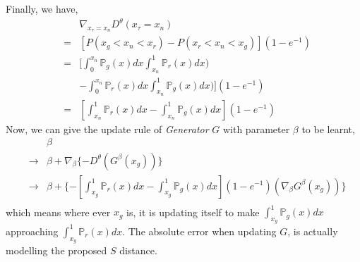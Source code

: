 \documentclass[letterpaper]{article} %
\begin{document}
Finally, we have,
\begin{eqnarray}\label{explain-d-gradient}
    && \nabla_{x_{\tau}=x_n} D^{\theta}(x_{\tau}=x_n) \nonumber\\
    &=& [P(x_g<x_n<x_r) - P(x_r<x_n<x_g)](1 - e^{-1}) \nonumber\\
    &=& [\int_{0}^{x_n}\mathbb{P}_g(x)dx \int_{x_n}^{1}\mathbb{P}_r(x)dx) \nonumber\\
    && - \int_{0}^{x_n}\mathbb{P}_r(x)dx \int_{x_n}^{1}\mathbb{P}_g(x)dx)](1 - e^{-1}) \nonumber\\
    &=& [\int_{x_n}^{1}\mathbb{P}_r(x)dx-\int_{x_n}^{1}\mathbb{P}_g(x)dx](1 - e^{-1})
\end{eqnarray}
Now, we can give the update rule of \textit{Generator} $G$ with parameter $\beta$ to be learnt,
\begin{eqnarray}\label{g-loss}
  && \beta \nonumber\\
  & \longrightarrow & \beta + \nabla_{\beta} \{ -D^{\theta}(G^{\beta}(x_g)) \} \nonumber\\
  & \longrightarrow & \beta + \{-[\int_{x_g}^{1}\mathbb{P}_r(x)dx-\int_{x_g}^{1}\mathbb{P}_g(x)dx](1 - e^{-1})(\nabla_{\beta}G^{\beta}(x_g)) \} \nonumber\\
\end{eqnarray}
which means where ever $x_g$ is, it is updating itself to make $\int_{x_g}^{1}\mathbb{P}_g(x)dx$ approaching $\int_{x_g}^{1}\mathbb{P}_r(x)dx$. The absolute error when updating $G$, is actually modelling the proposed $S$ distance.
\end{document}
